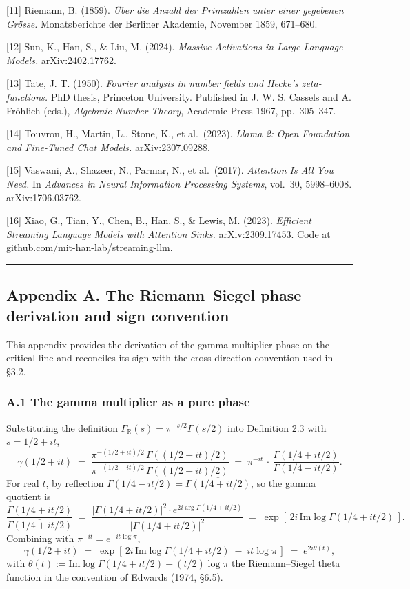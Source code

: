 \documentclass[
  letterpaper,
  11pt]{article}
\theoremstyle{plain}
\theoremstyle{definition}
\theoremstyle{remark}
\begin{document}
{[}11{]} Riemann, B. (1859). \emph{Über die Anzahl der Primzahlen unter einer gegebenen Grösse.} Monatsberichte der Berliner Akademie, November 1859, 671--680.

{[}12{]} Sun, K., Han, S., \& Liu, M. (2024). \emph{Massive Activations in Large Language Models.} arXiv:2402.17762.

{[}13{]} Tate, J. T. (1950). \emph{Fourier analysis in number fields and Hecke's zeta-functions.} PhD thesis, Princeton University. Published in J. W. S. Cassels and A. Fröhlich (eds.), \emph{Algebraic Number Theory}, Academic Press 1967, pp.~305--347.

{[}14{]} Touvron, H., Martin, L., Stone, K., et al.~(2023). \emph{Llama 2: Open Foundation and Fine-Tuned Chat Models.} arXiv:2307.09288.

{[}15{]} Vaswani, A., Shazeer, N., Parmar, N., et al.~(2017). \emph{Attention Is All You Need.} In \emph{Advances in Neural Information Processing Systems}, vol.~30, 5998--6008. arXiv:1706.03762.

{[}16{]} Xiao, G., Tian, Y., Chen, B., Han, S., \& Lewis, M. (2023). \emph{Efficient Streaming Language Models with Attention Sinks.} arXiv:2309.17453. Code at github.com/mit-han-lab/streaming-llm.

\begin{center}\rule{0.5\linewidth}{0.5pt}\end{center}

\subsection{Appendix A. The Riemann--Siegel phase derivation and sign convention}\label{appendix-a.-the-riemannsiegel-phase-derivation-and-sign-convention}

This appendix provides the derivation of the gamma-multiplier phase on the critical line and reconciles its sign with the cross-direction convention used in §3.2.

\subsubsection{A.1 The gamma multiplier as a pure phase}\label{a.1-the-gamma-multiplier-as-a-pure-phase}

Substituting the definition \(\Gamma_{\mathbb{R}}(s) = \pi^{-s/2}\Gamma(s/2)\) into Definition 2.3 with \(s = 1/2 + it\),
\[\gamma(1/2 + it) \;=\; \frac{\pi^{-(1/2 + it)/2}\,\Gamma((1/2 + it)/2)}{\pi^{-(1/2 - it)/2}\,\Gamma((1/2 - it)/2)} \;=\; \pi^{-it}\,\cdot\,\frac{\Gamma(1/4 + it/2)}{\Gamma(1/4 - it/2)}.\]
For real \(t\), by reflection \(\Gamma(1/4 - it/2) = \overline{\Gamma(1/4 + it/2)}\), so the gamma quotient is
\[\frac{\Gamma(1/4 + it/2)}{\overline{\Gamma(1/4 + it/2)}} \;=\; \frac{|\Gamma(1/4 + it/2)|^2 \cdot e^{2i\arg\Gamma(1/4 + it/2)}}{|\Gamma(1/4 + it/2)|^2} \;=\; \exp\!\left[\,2i\,\mathrm{Im}\log\Gamma(1/4 + it/2)\,\right].\]
Combining with \(\pi^{-it} = e^{-it\log\pi}\),
\[\gamma(1/2 + it) \;=\; \exp\!\left[\,2i\,\mathrm{Im}\log\Gamma(1/4 + it/2) \;-\; it\log\pi\,\right] \;=\; e^{2i\theta(t)},\]
with \(\theta(t) := \mathrm{Im}\log\Gamma(1/4 + it/2) - (t/2)\log\pi\) the Riemann--Siegel theta function in the convention of Edwards (1974, §6.5).
\end{document}
